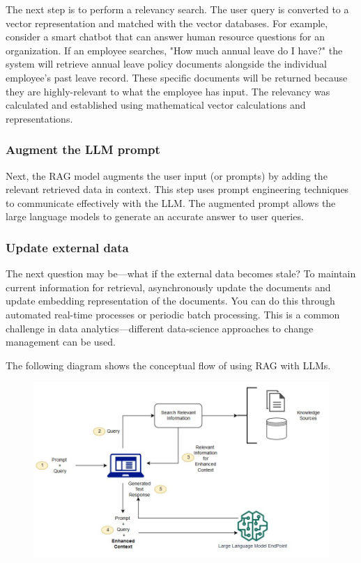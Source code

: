 The next step is to perform a relevancy search. The user query is converted to a vector representation 
and matched with the vector databases. For example, consider a smart chatbot that can answer human 
resource questions for an organization. If an employee searches, "How much annual leave do I have?" 
the system will retrieve annual leave policy documents alongside the individual employee's past leave 
record. These specific documents will be returned because they are highly-relevant to what the employee 
has input. The relevancy was calculated and established using mathematical vector calculations and 
representations.

\subsubsection{Augment the LLM prompt}

Next, the RAG model augments the user input (or prompts) by adding the relevant retrieved data in context. 
This step uses prompt engineering techniques to communicate effectively with the LLM. The augmented 
prompt allows the large language models to generate an accurate answer to user queries.

\subsubsection{Update external data}

The next question may be—what if the external data becomes stale? To maintain current information for 
retrieval, asynchronously update the documents and update embedding representation of the documents. 
You can do this through automated real-time processes or periodic batch processing. This is a common 
challenge in data analytics—different data-science approaches to change management can be used.

The following diagram shows the conceptual flow of using RAG with LLMs.

\begin{figure}[H]
\centering
\includegraphics[scale=0.618]{pix/rag/jumpstart-fm-rag.jpg}
\label{fig:jumpstart-fm-rag}
\end{figure}

